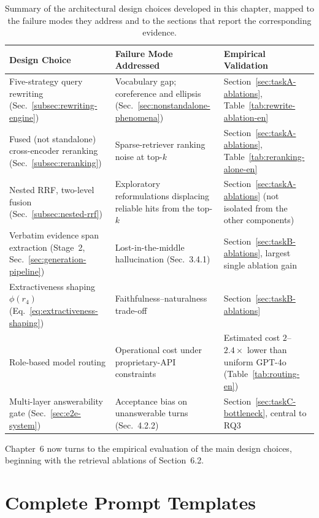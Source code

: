 \begin{table}[h]
\centering
\small
\begin{tabular}{p{3.6cm}p{4.6cm}p{4.6cm}}
\toprule
\textbf{Design Choice} & \textbf{Failure Mode Addressed} & \textbf{Empirical Validation} \\
\midrule
Five-strategy query rewriting (Sec.~\ref{subsec:rewriting-engine}) & Vocabulary gap; coreference and ellipsis (Sec.~\ref{sec:nonstandalone-phenomena}) & Section~\ref{sec:taskA-ablations}, Table~\ref{tab:rewrite-ablation-en} \\
Fused (not standalone) cross-encoder reranking (Sec.~\ref{subsec:reranking}) & Sparse-retriever ranking noise at top-$k$ & Section~\ref{sec:taskA-ablations}, Table~\ref{tab:reranking-alone-en} \\
Nested RRF, two-level fusion (Sec.~\ref{subsec:nested-rrf}) & Exploratory reformulations displacing reliable hits from the top-$k$ & Section~\ref{sec:taskA-ablations} (not isolated from the other components) \\
Verbatim evidence span extraction (Stage~2, Sec.~\ref{sec:generation-pipeline}) & Lost-in-the-middle hallucination (Sec.~3.4.1) & Section~\ref{sec:taskB-ablations}, largest single ablation gain \\
Extractiveness shaping $\phi(r_4)$ (Eq.~\ref{eq:extractiveness-shaping}) & Faithfulness--naturalness trade-off & Section~\ref{sec:taskB-ablations} \\
Role-based model routing & Operational cost under proprietary-API constraints & Estimated cost $2$--$2.4\times$ lower than uniform GPT-4o (Table~\ref{tab:routing-en}) \\
Multi-layer answerability gate (Sec.~\ref{sec:e2e-system}) & Acceptance bias on unanswerable turns (Sec.~4.2.2) & Section~\ref{sec:taskC-bottleneck}, central to RQ3 \\
\bottomrule
\end{tabular}
\caption{Summary of the architectural design choices developed in this chapter, mapped to the failure modes they address and to the sections that report the corresponding evidence.}
\label{tab:design-summary-en}
\end{table}

Chapter~6 now turns to the empirical evaluation of the main design choices, beginning with the retrieval ablations of Section~6.2.
\section{Complete Prompt Templates}
\label{sec:prompt-templates}

